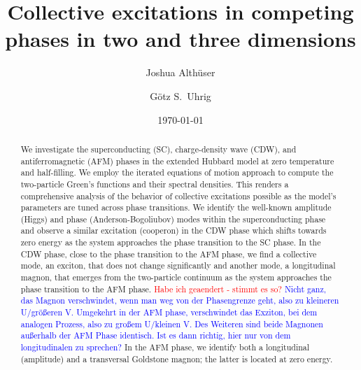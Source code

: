 \documentclass[
    reprint, 
    aps,
    preprintnumbers,
    twocolumn,
    prb,
    superscriptaddress
]{revtex4-2}
\newcommand{\red}[1]{\textcolor{red}{#1}}
\newcommand{\blue}[1]{\textcolor{blue}{#1}}
\begin{document}
 

\title{Collective excitations in competing phases in two and three dimensions}


\author{Joshua Alth\"user}

\author{G\"otz S.~Uhrig}

\date{\today}

\begin{abstract}
    We investigate the superconducting (SC), charge-density wave (CDW), and antiferromagnetic (AFM) phases in the 
		extended Hubbard model at zero temperature and half-filling. 
    We employ the iterated equations of motion approach to compute the two-particle Green's functions and their
		spectral densities. 
    This renders a comprehensive analysis of the behavior of collective excitations possible as the 
		model's parameters are tuned across phase transitions. 
    We identify the well-known amplitude (Higgs) and phase (Anderson-Bogoliubov) modes within the 
		superconducting phase and observe a similar excitation (cooperon) in the CDW phase which shifts towards 
		zero energy as the system approaches the phase transition to the SC phase. 
    In the CDW phase, close to the phase transition to the AFM phase, 
    we find a collective mode, an exciton, that does not change significantly 
    and another mode, a longitudinal magnon, that emerges from the two-particle continuum as the system approaches the phase transition to the AFM phase. 
    \red{Habe ich geaendert - stimmt es so?} \blue{Nicht ganz, das Magnon verschwindet, wenn man weg von der Phasengrenze geht, also zu kleineren U/größeren V. 
    Umgekehrt in der AFM phase, verschwindet das Exziton, bei dem analogen Prozess, also zu großem U/kleinen V. Des Weiteren sind beide Magnonen außerhalb der AFM Phase identisch.
    Ist es dann richtig, hier nur von dem longitudinalen zu sprechen?}
		In the AFM phase, we identify both a longitudinal (amplitude) and a 
		transversal Goldstone magnon; the latter is located at zero energy.
\end{abstract}
\end{document}
